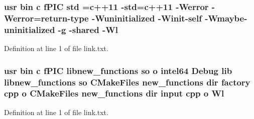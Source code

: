 \subsubsection[{\texorpdfstring{std}{std}}]{\setlength{\rightskip}{0pt plus 5cm}usr bin {\bf c} f\+P\+IC std ={\bf c}++11 -\/std={\bf c}++11 -\/Werror -\/Werror=return-\/type -\/Wuninitialized -\/Winit-\/self -\/Wmaybe-\/uninitialized -\/g -\/shared -\/{\bf Wl}}\hypertarget{common_2input__devices_2CMakeFiles_2new__functions_8dir_2link_8txt_a5f87c8f8e33670f7c8c5221b6be1bcc4}{}\label{common_2input__devices_2CMakeFiles_2new__functions_8dir_2link_8txt_a5f87c8f8e33670f7c8c5221b6be1bcc4}


Definition at line 1 of file link.\+txt.

\subsubsection[{\texorpdfstring{Wl}{Wl}}]{\setlength{\rightskip}{0pt plus 5cm}usr bin {\bf c} f\+P\+IC libnew\+\_\+functions {\bf so} o intel64 Debug lib libnew\+\_\+functions {\bf so} C\+Make\+Files new\+\_\+functions dir factory cpp o C\+Make\+Files new\+\_\+functions dir input cpp o Wl}\hypertarget{common_2input__devices_2CMakeFiles_2new__functions_8dir_2link_8txt_a343f4bbf39765d5b07355212d97d9ff9}{}\label{common_2input__devices_2CMakeFiles_2new__functions_8dir_2link_8txt_a343f4bbf39765d5b07355212d97d9ff9}


Definition at line 1 of file link.\+txt.

